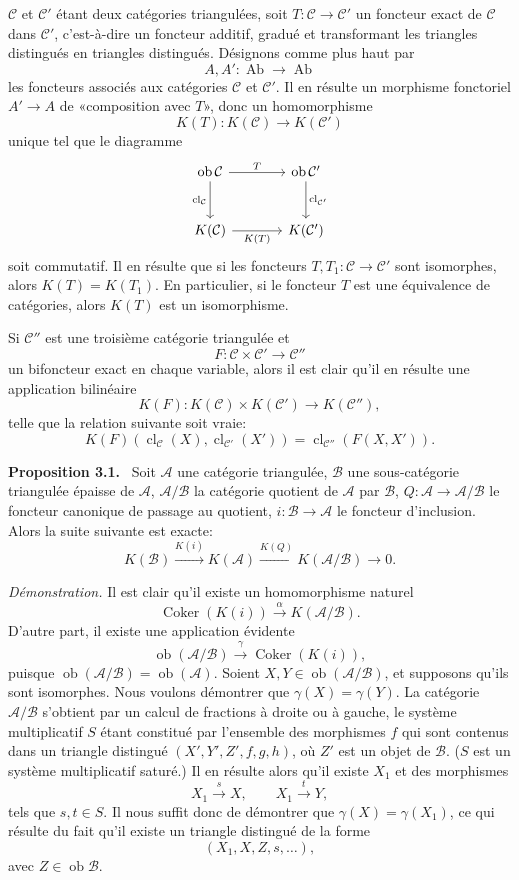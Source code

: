 \documentclass[11pt]{article}
\newenvironment{statement}[1]{\par\medskip\noindent\textbf{#1.}\ }{\par\medskip}
\providecommand{\Ob}{\operatorname{ob}}
\providecommand{\cC}{\mathcal C}
\providecommand{\Ob}{\operatorname{ob}}
\providecommand{\Ab}{\operatorname{Ab}}
\providecommand{\cC}{\mathcal C}
\providecommand{\cA}{\mathcal A}
\providecommand{\cB}{\mathcal B}
\providecommand{\Ab}{\operatorname{Ab}}
\providecommand{\Ob}{\operatorname{Ob}}
\providecommand{\Ob}{\operatorname{ob}}
\providecommand{\Ob}{\operatorname{Ob}}
\begin{document}
$\cC$ et $\cC'$ étant deux catégories triangulées, soit $T:\cC\to\cC'$ un foncteur exact de $\cC$ dans $\cC'$, c'est-à-dire un foncteur additif, gradué et transformant les triangles distingués en triangles distingués. Désignons comme plus haut par
\[
A,A':\Ab\longrightarrow\Ab
\]
les foncteurs associés aux catégories $\cC$ et $\cC'$. Il en résulte un morphisme fonctoriel $A'\to A$ de «composition avec $T$», donc un homomorphisme
\[
K(T):K(\cC)\longrightarrow K(\cC')
\]
unique tel que le diagramme
\[
\begin{tikzcd}[column sep=large,row sep=large]
\Ob\cC \arrow[r,"T"] \arrow[d,"\operatorname{cl}_{\cC}"']&
\Ob\cC' \arrow[d,"\operatorname{cl}_{\cC'}"]\\
K(\cC) \arrow[r,"K(T)"']& K(\cC')
\end{tikzcd}
\]
soit commutatif. Il en résulte que si les foncteurs $T,T_1:\cC\to\cC'$ sont isomorphes, alors $K(T)=K(T_1)$. En particulier, si le foncteur $T$ est une équivalence de catégories, alors $K(T)$ est un isomorphisme.

Si $\cC''$ est une troisième catégorie triangulée et
\[
F:\cC\times\cC'\longrightarrow \cC''
\]
un bifoncteur exact en chaque variable, alors il est clair qu'il en résulte une application bilinéaire
\[
K(F):K(\cC)\times K(\cC')\longrightarrow K(\cC''),
\]
telle que la relation suivante soit vraie:
\[
K(F)(\operatorname{cl}_{\cC}(X),\operatorname{cl}_{\cC'}(X'))
=
\operatorname{cl}_{\cC''}(F(X,X')).
\]

\begin{statement}{Proposition 3.1}
Soit $\cA$ une catégorie triangulée, $\cB$ une sous-catégorie triangulée épaisse de $\cA$, $\cA/\cB$ la catégorie quotient de $\cA$ par $\cB$, $Q:\cA\to\cA/\cB$ le foncteur canonique de passage au quotient, $i:\cB\to\cA$ le foncteur d'inclusion. Alors la suite suivante est exacte:
\[
K(\cB)\xrightarrow{K(i)}K(\cA)\xrightarrow{K(Q)}K(\cA/\cB)\longrightarrow 0.
\]
\end{statement}

\emph{Démonstration.} Il est clair qu'il existe un homomorphisme naturel
\[
\operatorname{Coker}(K(i))\xrightarrow{\alpha}K(\cA/\cB).
\]
D'autre part, il existe une application évidente
\[
\Ob(\cA/\cB)\xrightarrow{\gamma}\operatorname{Coker}(K(i)),
\]
puisque $\Ob(\cA/\cB)=\Ob(\cA)$. Soient $X,Y\in\Ob(\cA/\cB)$, et supposons qu'ils sont isomorphes. Nous voulons démontrer que $\gamma(X)=\gamma(Y)$. La catégorie $\cA/\cB$ s'obtient par un calcul de fractions à droite ou à gauche, le système multiplicatif $S$ étant constitué par l'ensemble des morphismes $f$ qui sont contenus dans un triangle distingué $(X',Y',Z',f,g,h)$, où $Z'$ est un objet de $\cB$. ($S$ est un système multiplicatif saturé.) Il en résulte alors qu'il existe $X_1$ et des morphismes
\[
X_1\xrightarrow{s}X,\qquad X_1\xrightarrow{t}Y,
\]
tels que $s,t\in S$. Il nous suffit donc de démontrer que $\gamma(X)=\gamma(X_1)$, ce qui résulte du fait qu'il existe un triangle distingué de la forme
\[
(X_1,X,Z,s,\ldots),
\]
avec $Z\in\Ob\cB$.
\end{document}
